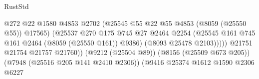 \begin{lexlean}{RustStd}
\begin{coremodule}
{\begin{coremodule}
{{{{{{{{{{{{{{{{{{{{{{{{{{{{{{{{{{                                                          @272
                                                          @22
                                                          @1580
                                                          @4853
                                                          @2702
                                                          (@25545
                                                            @55
                                                            @22
                                                            @55
                                                            @4853
                                                            (@8059 (@25550 @55))
                                                            @17565)
                                                          (@25537
                                                            @270
                                                            @175
                                                            @745
                                                            @27
                                                            @2464
                                                            @2254
                                                            (@25545
                                                              @161
                                                              @745
                                                              @161
                                                              @2464
                                                              (@8059 (@25550 @161))
                                                              @9386)
                                                            (@8093 @25478 @2103)))))
                                                    @21751
                                                    @21754
                                                    @21757
                                                    @21760))
                                                (@9212 (@25504 @89))
                                                (@8156 (@25509 @673 @205))
                                                (@7948 (@25516 @205 @141 @2410 @2306))
                                                (@9416
                                                  @25374
                                                  @1612
                                                  @1590
                                                  @2306
                                                  @6227
}}}}}}}}}}}}}}}}}}}}}}}}}}}}}}}}}}
\end{coremodule}}
\end{coremodule}
\end{lexlean}
